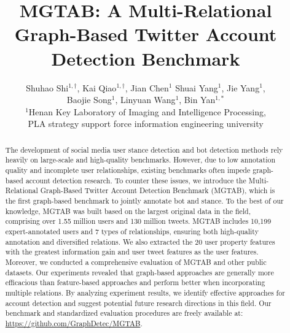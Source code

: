 \documentclass[10pt,twocolumn,letterpaper]{article}
\begin{document}
\title{MGTAB: A Multi-Relational Graph-Based Twitter Account Detection Benchmark}

\author{Shuhao Shi$^{1,\dag}$, Kai Qiao$^{1,\dag}$, Jian Chen$^{1}$ Shuai Yang$^{1}$, Jie Yang$^{1}$,\\
Baojie Song$^{1}$, Linyuan Wang$^{1}$, Bin Yan$^{1,*}$\\
$^1$Henan Key Laboratory of Imaging and Intelligence Processing,\\ PLA strategy support force information engineering university\\
\vspace*{-0.3cm}
}

\maketitle
\ificcvfinal\thispagestyle{empty}\fi


\begin{abstract}
\vspace*{-0.2cm}
The development of social media user stance detection and bot detection methods rely heavily on large-scale and high-quality benchmarks. However, due to low annotation quality and incomplete user relationships, existing benchmarks often impede graph-based account detection research. To counter these issues, we introduce the Multi-Relational Graph-Based Twitter Account Detection Benchmark (MGTAB), which is the first graph-based benchmark to jointly annotate bot and stance. To the best of our knowledge, MGTAB was built based on the largest original data in the field, comprising over 1.55 million users and 130 million tweets. MGTAB includes 10,199 expert-annotated users and 7 types of relationships, ensuring both high-quality annotation and diversified relations. We also extracted the 20 user property features with the greatest information gain and user tweet features as the user features. Moreover, we conducted a comprehensive evaluation of MGTAB and other public datasets. Our experiments revealed that graph-based approaches are generally more efficacious than feature-based approaches and perform better when incorporating multiple relations. By analyzing experiment results, we identify effective approaches for account detection and suggest potential future research directions in this field. Our benchmark and standardized evaluation procedures are freely available at: \small{\url{https://github.com/GraphDetec/MGTAB}}.
\vspace*{-0.35cm}
\end{abstract}
\end{document}

